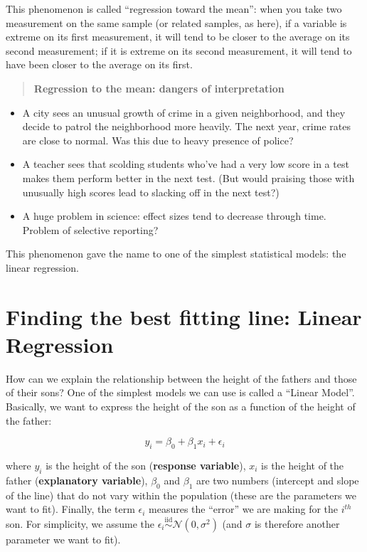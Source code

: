 \documentclass[
  letterpaper,
  DIV=11,
  numbers=noendperiod]{scrreprt}
\providecommand{\tightlist}{%
  \setlength{\itemsep}{0pt}\setlength{\parskip}{0pt}}\usepackage{longtable,booktabs,array}
\begin{document}
This phenomenon is called ``regression toward the mean'': when you take
two measurement on the same sample (or related samples, as here), if a
variable is extreme on its first measurement, it will tend to be closer
to the average on its second measurement; if it is extreme on its second
measurement, it will tend to have been closer to the average on its
first.

\begin{quote}
\textbf{Regression to the mean: dangers of interpretation}
\end{quote}

\begin{itemize}
\tightlist
\item
  A city sees an unusual growth of crime in a given neighborhood, and
  they decide to patrol the neighborhood more heavily. The next year,
  crime rates are close to normal. Was this due to heavy presence of
  police?
\item
  A teacher sees that scolding students who've had a very low score in a
  test makes them perform better in the next test. (But would praising
  those with unusually high scores lead to slacking off in the next
  test?)
\item
  A huge problem in science: effect sizes tend to decrease through time.
  Problem of selective reporting?
\end{itemize}

This phenomenon gave the name to one of the simplest statistical models:
the linear regression.

\section{Finding the best fitting line: Linear
Regression}\label{finding-the-best-fitting-line-linear-regression}

How can we explain the relationship between the height of the fathers
and those of their sons? One of the simplest models we can use is called
a ``Linear Model''. Basically, we want to express the height of the son
as a function of the height of the father:

\[
y_i = \beta_0 + \beta_1 x_i + \epsilon_i
\]

where \(y_i\) is the height of the son (\textbf{response variable}),
\(x_i\) is the height of the father (\textbf{explanatory variable}),
\(\beta_0\) and \(\beta_1\) are two numbers (intercept and slope of the
line) that do not vary within the population (these are the parameters
we want to fit). Finally, the term \(\epsilon_i\) measures the ``error''
we are making for the \(i^{th}\) son. For simplicity, we assume the
\(\epsilon_i \overset{\text{iid}}{\sim} \mathcal N(0, \sigma^2)\) (and
\(\sigma\) is therefore another parameter we want to fit).
\end{document}
